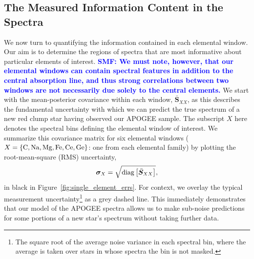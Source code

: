 \documentclass[a4paper,fleqn,usenatbib]{mnras}
\newcommand{\speccov}{{\bm S}}
\newcommand{\smf}[1]{\textbf{\textcolor{blue}{SMF: #1}}}
\begin{document}
\subsection{The Measured Information Content in the Spectra}
\label{sec:info}

We now turn to quantifying the information contained in each elemental window. Our aim is to determine the regions of spectra that are most informative about particular elements of interest. \smf{We must note, however, that our elemental windows can contain spectral features in addition to the central absorption line, and thus strong correlations between two windows are not necessarily due solely to the central elements.}
We start with the mean-posterior covariance within each window, $\bar{\speccov}_{XX}$, as this describes the fundamental uncertainty with which we can predict the true spectrum of a new red clump star having observed our APOGEE sample. The subscript $X$ here denotes the spectral bins defining the elemental window of interest. We summarize this covariance matrix for six elemental windows ($X=\{{\rm C, Na, Mg, Fe, Ce, Ge}\}$: one from each elemental family) by plotting the root-mean-square (RMS) uncertainty,
\begin{equation}
\bm{\sigma}_X = \sqrt{{\rm diag} \left[\bar{\speccov}_{XX}\right]},
\end{equation}
in black in Figure~\ref{fig:single_element_errs}. For context, we overlay the typical measurement uncertainty\footnote{The square root of the average noise variance in each spectral bin, where the average is taken over stars in whose spectra the bin is not masked.} as a grey dashed line. This immediately demonstrates that our model of the APOGEE spectra allows us to make sub-noise predictions for some portions of a new star's spectrum without taking further data.
\end{document}
